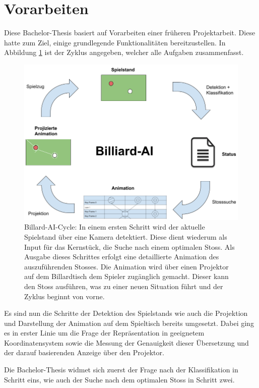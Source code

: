\section{Vorarbeiten}\label{kap:vorarbeiten}
Diese Bachelor-Thesis basiert auf Vorarbeiten einer früheren Projektarbeit. Diese hatte zum Ziel, einige
grundlegende Funktionalitäten bereitzustellen. In Abbildung \ref{fig:billiard_ai_cycle} ist der Zyklus angegeben,
welcher alle Aufgaben zusammenfasst.

\begin{figure}[h!]
    \begin{center}
        \includegraphics[width=0.8\linewidth]{../common/03_billiard_ai/resources/19_billiard_ai_cycle.png}
    \end{center}
    \caption{Billard-AI-Cycle: In einem ersten Schritt wird der aktuelle Spielstand über eine Kamera detektiert.
    Diese dient wiederum als Input für das Kernstück, die Suche nach einem optimalen Stoss.
    Als Ausgabe dieses Schrittes erfolgt eine detaillierte Animation des auszuführenden Stosses.
    Die Animation wird über einen Projektor auf dem Billardtisch dem Spieler zugänglich gemacht. Dieser kann den Stoss ausführen,
        was zu einer neuen Situation führt und der Zyklus beginnt von vorne.}
    \label{fig:billiard_ai_cycle}
\end{figure}

Es sind nun die Schritte der Detektion des Spielstands wie auch die Projektion und Darstellung der Animation auf dem
Spieltisch bereits umgesetzt. Dabei ging es in erster Linie um die Frage der Repräsentation in geeignetem Koordinatensystem
sowie die Messung der Genauigkeit dieser Übersetzung und der darauf basierenden Anzeige über den Projektor.

Die Bachelor-Thesis widmet sich zuerst der Frage nach der Klassifikation in Schritt eins, wie auch der Suche
nach dem optimalen Stoss in Schritt zwei.